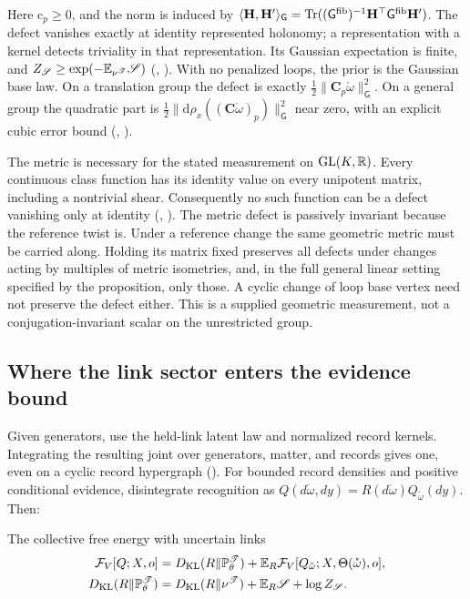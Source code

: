 Here $\mathrm c_p\geq0$, and the norm is induced by
$\langle\mathbf H,\mathbf H'\rangle_{\mathsf G}
=\operatorname{Tr}((\mathsf G^{\mathrm{fib}})^{-1}\mathbf H^\top\mathsf G^{\mathrm{fib}}\mathbf H')$.
The defect vanishes exactly at identity represented holonomy; a representation with a kernel
detects triviality in that representation. Its Gaussian expectation is finite, and
$Z_{\mathscr S}\geq\exp(-\mathbb E_{\nu^{\mathscr T}}\mathscr S)$
(, ). With no penalized loops,
the prior is the Gaussian base law. On a translation group the defect is exactly
$\tfrac12\lVert\mathbf C_p\mathring\omega\rVert_{\mathsf G}^2$. On a general group the quadratic part is
$\tfrac12\lVert\mathrm d\rho_x((\mathbf C\mathring\omega)_p)\rVert_{\mathsf G}^2$ near zero,
with an explicit cubic error bound
(, ).

The metric is necessary for the stated measurement on $\mathrm{GL}(K,\mathbb R)$. Every continuous class
function has its identity value on every unipotent matrix, including a nontrivial shear.
Consequently no such function can be a defect vanishing only at identity
(, ).
The metric defect is passively invariant because the reference twist is. Under a reference
change the same geometric metric must be carried along. Holding its matrix fixed preserves
all defects under changes acting by multiples of metric isometries, and, in the full general
linear setting specified by the proposition, only those. A cyclic change of loop base vertex
need not preserve the defect either. This is a supplied geometric measurement, not a
conjugation-invariant scalar on the unrestricted group.

\subsection{Where the link sector enters the evidence bound}

Given generators, use the held-link latent law and normalized record kernels. Integrating
the resulting joint over generators, matter, and records gives one, even on a cyclic record
hypergraph (). For bounded record densities and positive
conditional evidence, disintegrate recognition as $Q(d\mathring\omega,dy)
=R(d\mathring\omega)Q_{\mathring\omega}(dy)$. Then:

\begin{keyequation}{The collective free energy with uncertain links}
\[
\begin{aligned}
\mathcal F_V[Q;X,o]
={}&D_{\mathrm{KL}}(R\Vert\mathbb P^{\mathscr T}_\theta)
+\mathbb E_R\mathcal F_V[Q_{\mathring\omega};X,\Theta(\mathring\omega),o],\\
D_{\mathrm{KL}}(R\Vert\mathbb P^{\mathscr T}_\theta)
={}&D_{\mathrm{KL}}(R\Vert\nu^{\mathscr T})+\mathbb E_R\mathscr S+\log Z_{\mathscr S}.
\end{aligned}
\]
\end{keyequation}

